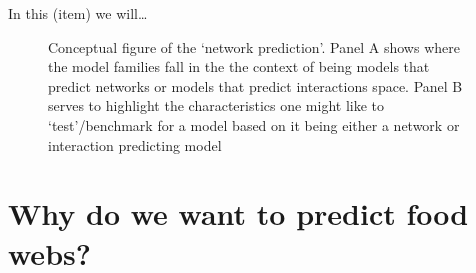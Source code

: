 \documentclass[
]{article}
\begin{document}
In this (item) we will\ldots{}

\begin{figure}


\caption{\label{fig-concept}Conceptual figure of the `network
prediction'. Panel A shows where the model families fall in the the
context of being models that predict networks or models that predict
interactions space. Panel B serves to highlight the characteristics one
might like to `test'/benchmark for a model based on it being either a
network or interaction predicting model}

\end{figure}%

\section{Why do we want to predict food webs?}\label{sec-network-why}
\end{document}
